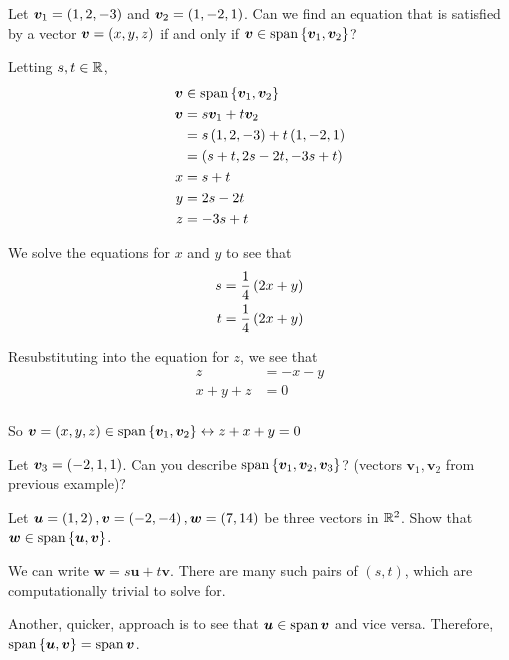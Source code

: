 \documentclass[11pt]{article}
\begin{document}
\begin{example}
  
  Let $\bm{v}_1 = \left ( 1, 2, -3 \right)$ and $\bm{v}_2 = \left ( 1, -2, 1 \right)$.
  Can we find an equation that is satisfied by a vector $\bm{v} = \left ( x, y, z \right)$ if and only if $\bm{v} \in \operatorname{span} \left \{ \bm{v}_1, \bm{v}_2 \right \}$?

  Letting $s,t \in \mathbb R$,
  \begin{align*}
    \bm{v} &\in \operatorname{span} \left \{ \bm{v}_1, \bm{v}_2 \right \} \\
    \bm{v} &= s \bm{v}_1 + t \bm{v}_2 \\
           &= s \left ( 1,2,-3 \right) + t \left ( 1, -2, 1 \right) \\
           &= \left ( s+t, 2s-2t, -3s+t \right) \\
    x &= s+t \\
    y &= 2s-2t \\
    z &= -3s+t \\
  \end{align*}

  We solve the equations for $x$ and $y$ to see that
  \begin{align*}
    s &= \frac{1}{4} \left ( 2x+y \right) \\
    t &= \frac{1}{4} \left ( 2x+y \right) \\
  \end{align*}

  Resubstituting into the equation for $z$, we see that
  \begin{align*}
    z &= -x-y \\
    x+y+z &= 0 \\
  \end{align*}

  So $\bm{v} = \left ( x, y, z \right) \in \operatorname{span} \left \{ \bm{v}_1, \bm{v}_2 \right \} \leftrightarrow z+x+y=0$
\end{example}

\begin{example}
  
  Let $\bm{v}_3 = \left ( -2, 1, 1 \right)$.
  Can you describe $\operatorname{span} \left \{ \bm{v}_1, \bm{v}_2, \bm{v}_3 \right \}$? (vectors $\bm{v}_1, \bm{v}_2$ from previous example)?
\end{example}

\begin{example}
  
  Let $\bm{u} = \left ( 1,2 \right), \bm{v} = \left ( -2, -4 \right), \bm{w} = \left ( 7,14 \right)$ be three vectors in $\mathbb R^2$.
  Show that $\bm{w} \in \operatorname{span} \left \{ \bm{u}, \bm{v} \right \}$.

  We can write $\bm{w} = s \bm{u} + t \bm{v}$.
  There are many such pairs of $(s,t)$, which are computationally trivial to solve for.

  Another, quicker, approach is to see that $\bm{u} \in \operatorname{span} \bm{v}$ and vice versa.
  Therefore, $\operatorname{span} \left \{ \bm{u}, \bm{v} \right \} = \operatorname{span} \bm{v} $.
\end{example}
\end{document}
